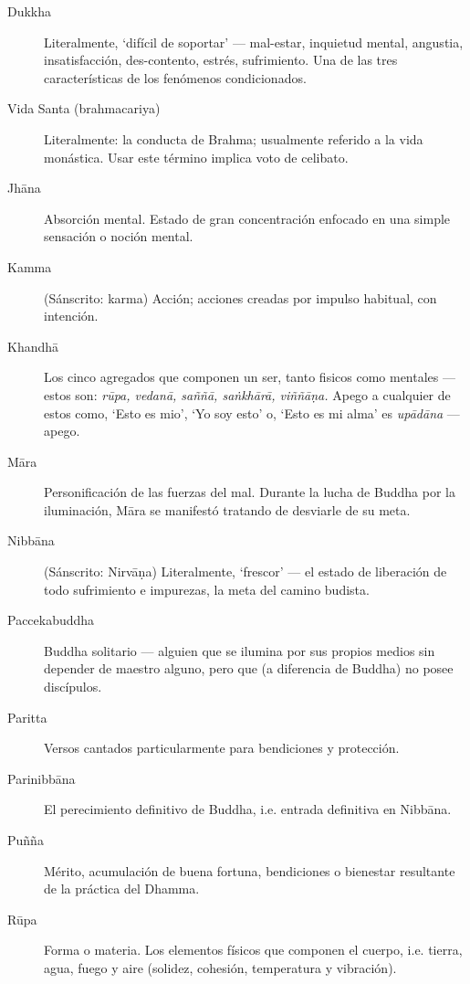 \begin{description}
\item[Dukkha] Literalmente, ‘difícil de soportar’ --- mal-estar, inquietud mental, angustia, insatisfacción, des-contento, estrés, sufrimiento. Una de las tres características de los fenómenos condicionados.

\item[Vida Santa (brahmacariya)] Literalmente: la conducta de Brahma; usualmente referido a la vida monástica. Usar este término implica voto de celibato.

\item[Jhāna] Absorción mental. Estado de gran concentración enfocado en una simple sensación o noción mental.

\item[Kamma] (Sánscrito: karma) Acción; acciones creadas por impulso habitual, con intención.

\item[Khandhā] Los cinco agregados que componen un ser, tanto fisicos como mentales ---
  estos son: \emph{rūpa, vedanā, saññā, saṅkhārā, viññāṇa.} Apego a cualquier de estos como, ‘Esto es mio’, ‘Yo soy esto’ o, ‘Esto es mi alma’ es
  \emph{upādāna} --- apego.

\item[Māra] Personificación de las fuerzas del mal. Durante la lucha de Buddha por la iluminación, Māra se manifestó tratando de desviarle de su meta.

\item[Nibbāna] (Sánscrito: Nirvāṇa) Literalmente, ‘frescor’ --- el estado de liberación de todo sufrimiento e impurezas, la meta del camino budista.

\item[Paccekabuddha] Buddha solitario --- alguien que se ilumina por sus propios medios sin depender de maestro alguno, pero que (a diferencia de Buddha) no posee discípulos.

\item[Paritta] Versos cantados particularmente para bendiciones y protección.

\item[Parinibbāna] El perecimiento definitivo de Buddha, i.e. entrada definitiva en 
  Nibbāna.

\item[Puñña] Mérito, acumulación de buena fortuna, bendiciones o bienestar resultante de la práctica del Dhamma.

\item[Rūpa] Forma o materia. Los elementos físicos que componen el cuerpo,
  i.e. tierra, agua, fuego y aire (solidez, cohesión, temperatura y
  vibración).


\end{description}
